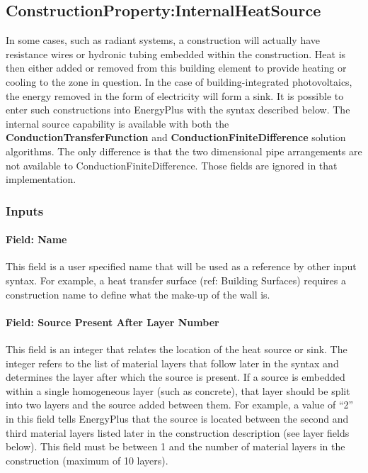 \subsection{ConstructionProperty:InternalHeatSource}\label{constructioninternalsource}

In some cases, such as radiant systems, a construction will actually have
resistance wires or hydronic tubing embedded within the construction. Heat is
then either added or removed from this building element to provide heating or
cooling to the zone in question. In the case of building-integrated
photovoltaics, the energy removed in the form of electricity will form a sink.
It is possible to enter such constructions into EnergyPlus with the syntax
described below. The internal source capability is available with both the
\textbf{ConductionTransferFunction} and \textbf{ConductionFiniteDifference}
solution algorithms. The only difference is that the two dimensional pipe
arrangements are not available to ConductionFiniteDifference. Those fields are
ignored in that implementation.

\subsubsection{Inputs}\label{inputs-38}

\paragraph{Field: Name}\label{field-name-31-000}

This field is a user specified name that will be used as a reference by other input syntax. For example, a heat transfer surface (ref: Building Surfaces) requires a construction name to define what the make-up of the wall is.

\paragraph{Field: Source Present After Layer Number}\label{field-source-present-after-layer-number}

This field is an integer that relates the location of the heat source or sink. The integer refers to the list of material layers that follow later in the syntax and determines the layer after which the source is present. If a source is embedded within a single homogeneous layer (such as concrete), that layer should be split into two layers and the source added between them. For example, a value of ``2'' in this field tells EnergyPlus that the source is located between the second and third material layers listed later in the construction description (see layer fields below). This field must be between 1 and the number of material layers in the construction (maximum of 10 layers).


